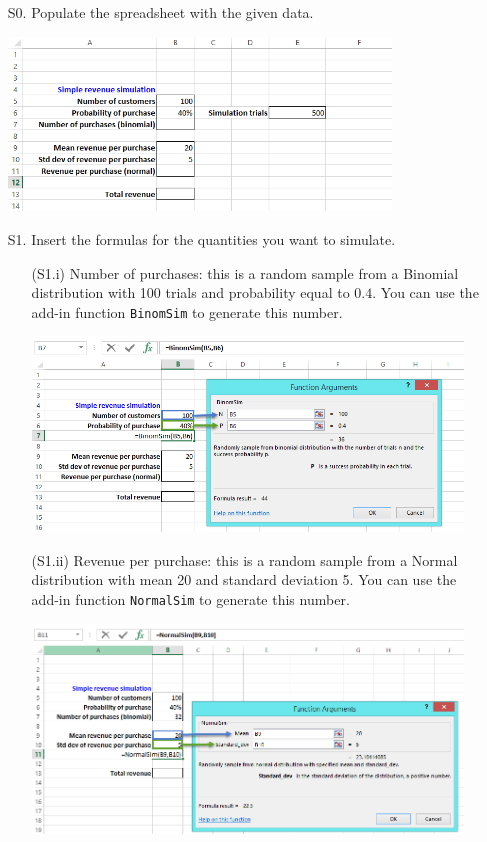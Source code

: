 \documentclass[12pt]{article}
\begin{document}
\begin{itemize}
\item[S0.] Populate the spreadsheet with the given data.

\centerline{\includegraphics[width=4in]{figures/simul1.png}}

\item[S1.] Insert the formulas for the quantities you want to simulate.

\begin{itemize}
\item[(S1.i)] Number of purchases: this is a random sample from a Binomial distribution with 100 trials and probability equal to $0.4$. You can use the add-in function \texttt{BinomSim} to generate this number.

\centerline{\includegraphics[width=4.5in]{figures/simul2.png}}

\item[(S1.ii)] Revenue per purchase: this is a random sample from a Normal distribution with mean 20 and standard deviation 5. You can use the add-in function \texttt{NormalSim} to generate this number.

\centerline{\includegraphics[width=4.5in]{figures/simul3.png}}


\end{itemize}
\end{itemize}
\end{document}
